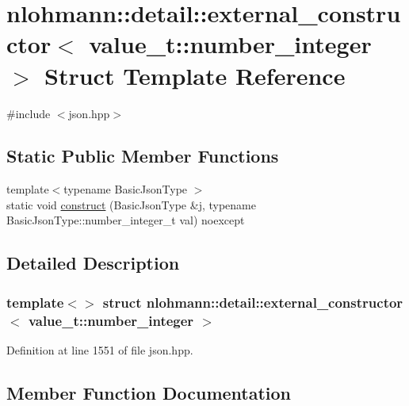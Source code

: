 \hypertarget{structnlohmann_1_1detail_1_1external__constructor_3_01value__t_1_1number__integer_01_4}{}\section{nlohmann\+:\+:detail\+:\+:external\+\_\+constructor$<$ value\+\_\+t\+:\+:number\+\_\+integer $>$ Struct Template Reference}
\label{structnlohmann_1_1detail_1_1external__constructor_3_01value__t_1_1number__integer_01_4}


{\ttfamily \#include $<$json.\+hpp$>$}

\subsection*{Static Public Member Functions}
\begin{DoxyCompactItemize}
\item 
{\footnotesize template$<$typename Basic\+Json\+Type $>$ }\\static void \hyperlink{structnlohmann_1_1detail_1_1external__constructor_3_01value__t_1_1number__integer_01_4_a7c3949672ddb45095cc2527635feef0b}{construct} (Basic\+Json\+Type \&j, typename Basic\+Json\+Type\+::number\+\_\+integer\+\_\+t val) noexcept
\end{DoxyCompactItemize}


\subsection{Detailed Description}
\subsubsection*{template$<$$>$\newline
struct nlohmann\+::detail\+::external\+\_\+constructor$<$ value\+\_\+t\+::number\+\_\+integer $>$}



Definition at line 1551 of file json.\+hpp.



\subsection{Member Function Documentation}
\mbox{\label{structnlohmann_1_1detail_1_1external__constructor_3_01value__t_1_1number__integer_01_4_a7c3949672ddb45095cc2527635feef0b}} 
